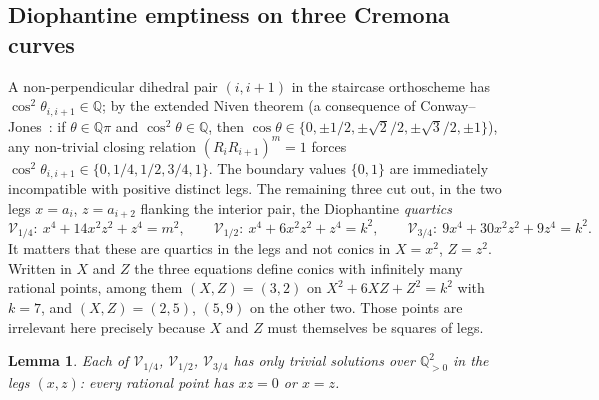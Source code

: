 \documentclass[11pt,a4paper]{article}
\newtheorem{lemma}[theorem]{Lemma}
\theoremstyle{remark}
\theoremstyle{plain}
\begin{document}
\subsection{Diophantine emptiness on three Cremona curves}

A non-perpendicular dihedral pair $(i, i+1)$ in the staircase
orthoscheme has $\cos^2 \theta_{i, i+1} \in \mathbb{Q}$; by the
extended Niven theorem (a consequence of Conway--Jones~\cite{conway-jones}:
if $\theta \in \mathbb{Q}\pi$ and $\cos^2\theta \in \mathbb{Q}$, then
$\cos\theta \in \{0, \pm 1/2, \pm\sqrt 2/2, \pm\sqrt 3/2, \pm 1\}$),
any non-trivial closing relation $(R_i R_{i+1})^m = 1$ forces
$\cos^2 \theta_{i, i+1} \in \{0, 1/4, 1/2, 3/4, 1\}$.  The boundary
values $\{0, 1\}$ are immediately incompatible with positive distinct
legs.  The remaining three cut out, in the two legs $x = a_i$, $z = a_{i+2}$ flanking
the interior pair, the Diophantine \emph{quartics}
\[
\mathcal{V}_{1/4} :\ x^4 + 14 x^2 z^2 + z^4 = m^2, \qquad
\mathcal{V}_{1/2} :\ x^4 + 6 x^2 z^2 + z^4 = k^2, \qquad
\mathcal{V}_{3/4} :\ 9 x^4 + 30 x^2 z^2 + 9 z^4 = k^2.
\]
It matters that these are quartics in the legs and not conics in
$X = x^2$, $Z = z^2$. Written in $X$ and $Z$ the three equations define conics
with infinitely many rational points, among them $(X,Z)=(3,2)$ on
$X^2+6XZ+Z^2=k^2$ with $k=7$, and $(X,Z)=(2,5)$, $(5,9)$ on the other two. Those
points are irrelevant here precisely because $X$ and $Z$ must themselves be
squares of legs.

\begin{lemma}\label{lem:cremona-empty}
Each of $\mathcal{V}_{1/4}$, $\mathcal{V}_{1/2}$, $\mathcal{V}_{3/4}$ has only
trivial solutions over $\mathbb{Q}_{>0}^2$ in the legs $(x,z)$: every rational
point has $xz = 0$ or $x = z$.
\end{lemma}
\end{document}
